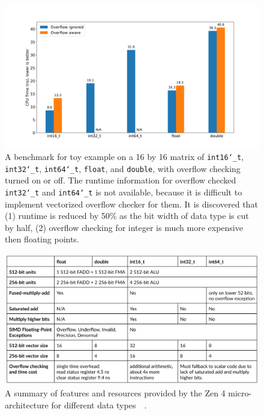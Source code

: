 \documentclass[logo,bsc,singlespacing,parskip]{infthesis}
\newcommand{\dtshort}{\texttt{int16\char`_t}}
\newcommand{\dtint}{\texttt{int32\char`_t}}
\newcommand{\dtlong}{\texttt{int64\char`_t}}
\newcommand{\dtfloat}{\texttt{float}}
\newcommand{\dtdouble}{\texttt{double}}
\begin{document}
\begin{figure}[H]\captionsetup{name=Figure}
    \begin{center}
        \includegraphics[width=\linewidth]{image/bench_datatype.png}
    \end{center}
    \caption{ A benchmark for toy example on a 16 by 16 matrix of \dtshort{},
\dtint{}, \dtlong{}, \dtfloat{}, and \dtdouble{}, with overflow checking turned
on or off. The runtime information for overflow checked \dtint{} and \dtlong{}
is not available, because it is difficult to implement vectorized overflow
checker for them. It is discovered that (1) runtime is
reduced by 50\% as the bit width of data type is cut by half, (2) overflow
checking for integer is much more expensive then floating points. }
    \label{bench_datatype}
\end{figure}


\begin{figure}[H]\captionsetup{name=Figure}
    \includegraphics[width=\linewidth]{image/arch-table.png}
    \caption{A summary of features and resources provided by the Zen 4
    micro-architecture for different data
    types~\cite{Zen4Critique}~\cite{Zen2ChipWiki}.}
    \label{archtable}
\end{figure}
\end{document}
